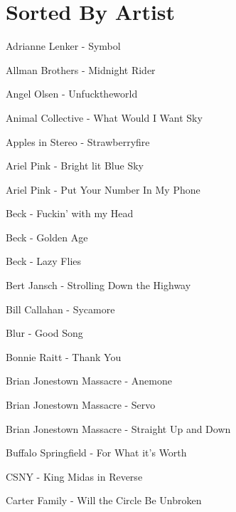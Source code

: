 \section*{Sorted By Artist}
Adrianne Lenker - Symbol \dotfill \pageref{Symbol - Adrianne Lenker} 

Allman Brothers - Midnight Rider \dotfill \pageref{Midnight Rider - Allman Brothers} 

Angel Olsen - Unfucktheworld \dotfill \pageref{Unfucktheworld - Angel Olsen} 

Animal Collective - What Would I Want Sky \dotfill \pageref{What Would I Want Sky - Animal Collective} 

Apples in Stereo - Strawberryfire \dotfill \pageref{Strawberryfire - Apples in Stereo} 

Ariel Pink - Bright lit Blue Sky \dotfill \pageref{Bright lit Blue Sky - Ariel Pink} 

Ariel Pink - Put Your Number In My Phone \dotfill \pageref{Put Your Number In My Phone - Ariel Pink} 

Beck - Fuckin' with my Head \dotfill \pageref{Fuckin' with my Head - Beck} 

Beck - Golden Age \dotfill \pageref{Golden Age - Beck} 

Beck - Lazy Flies \dotfill \pageref{Lazy Flies - Beck} 

Bert Jansch - Strolling Down the Highway \dotfill \pageref{Strolling Down the Highway - Bert Jansch} 

Bill Callahan - Sycamore \dotfill \pageref{Sycamore - Bill Callahan} 

Blur - Good Song \dotfill \pageref{Good Song - Blur} 

Bonnie Raitt - Thank You \dotfill \pageref{Thank You - Bonnie Raitt} 

Brian Jonestown Massacre - Anemone \dotfill \pageref{Anemone - Brian Jonestown Massacre} 

Brian Jonestown Massacre - Servo \dotfill \pageref{Servo - Brian Jonestown Massacre} 

Brian Jonestown Massacre - Straight Up and Down \dotfill \pageref{Straight Up and Down - Brian Jonestown Massacre} 

Buffalo Springfield - For What it's Worth \dotfill \pageref{For What it's Worth - Buffalo Springfield} 

CSNY - King Midas in Reverse \dotfill \pageref{King Midas in Reverse - CSNY} 

Carter Family - Will the Circle Be Unbroken \dotfill \pageref{Will the Circle Be Unbroken - Carter Family} 

